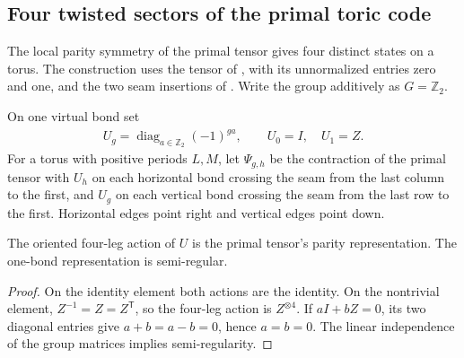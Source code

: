 \subsection{Four twisted sectors of the primal toric code}
\label{sec:peps_toric_code_torus_sectors}

The local parity symmetry of the primal tensor gives four distinct states
on a torus. The construction uses the tensor of
\cite[Appendix A]{Cirac2021Matrix}, with its unnormalized entries zero and
one, and the two seam insertions of
\cite[Definition 5.6 and Theorem 5.9]{Schuch2010PEPS}.
Write the group additively as $G=\mathbb Z_2$.

\begin{definition}
    \label{def:toric_code_torus_states}
    \leanok
    On one virtual bond set
    \begin{align}
        U_g=\operatorname{diag}_{a\in\mathbb Z_2}(-1)^{ga},
        \qquad U_0=I,\quad U_1=Z.
    \end{align}
    For a torus with positive periods $L,M$, let $\Psi_{g,h}$ be the
    contraction of the primal tensor with $U_h$ on each horizontal bond
    crossing the seam from the last column to the first, and $U_g$ on
    each vertical bond crossing the seam from the last row to the first.
    Horizontal edges point right and vertical edges point down.
\end{definition}

\begin{lemma}
    \label{lem:toric_code_bond_semiregular}
    \leanok
    The oriented four-leg action of $U$ is the primal tensor's parity
    representation. The one-bond representation is semi-regular.
\end{lemma}
\begin{proof}\leanok
    On the identity element both actions are the identity. On the
    nontrivial element, $Z^{-1}=Z=Z^{\mathsf T}$, so the four-leg action
    is $Z^{\otimes4}$. If $aI+bZ=0$, its two diagonal entries give
    $a+b=a-b=0$, hence $a=b=0$. The linear independence of the group
    matrices implies semi-regularity.
\end{proof}

